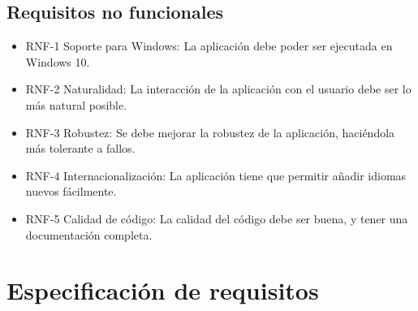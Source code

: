 \subsection{Requisitos no funcionales}
\begin{itemize}
    \item RNF-1 Soporte para Windows: La aplicación debe poder ser ejecutada en Windows 10.
    \item RNF-2 Naturalidad: La interacción de la aplicación con el usuario debe ser lo más natural posible.
    \item RNF-3 Robustez: Se debe mejorar la robustez de la aplicación, haciéndola más tolerante a fallos.
    \item RNF-4 Internacionalización: La aplicación tiene que permitir añadir idiomas nuevos fácilmente.
    \item RNF-5 Calidad de código: La calidad del código debe ser buena, y tener una documentación completa.
\end{itemize}

\section{Especificación de requisitos}